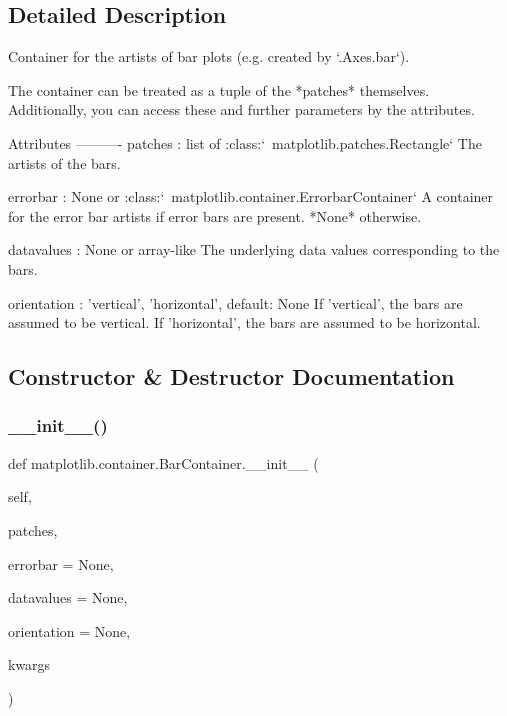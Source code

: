 \subsection{Detailed Description}
\begin{DoxyVerb}Container for the artists of bar plots (e.g. created by `.Axes.bar`).

The container can be treated as a tuple of the *patches* themselves.
Additionally, you can access these and further parameters by the
attributes.

Attributes
----------
patches : list of :class:`~matplotlib.patches.Rectangle`
    The artists of the bars.

errorbar : None or :class:`~matplotlib.container.ErrorbarContainer`
    A container for the error bar artists if error bars are present.
    *None* otherwise.

datavalues : None or array-like
    The underlying data values corresponding to the bars.

orientation : {'vertical', 'horizontal'}, default: None
    If 'vertical', the bars are assumed to be vertical.
    If 'horizontal', the bars are assumed to be horizontal.\end{DoxyVerb}
 

\subsection{Constructor \& Destructor Documentation}
\mbox{\label{classmatplotlib_1_1container_1_1BarContainer_a9604d76d1dfcdc6f38fad980ab65397a}} 
\subsubsection{\texorpdfstring{\+\_\+\+\_\+init\+\_\+\+\_\+()}{\_\_init\_\_()}}
{\footnotesize\ttfamily def matplotlib.\+container.\+Bar\+Container.\+\_\+\+\_\+init\+\_\+\+\_\+ (\begin{DoxyParamCaption}\item[{}]{self,  }\item[{}]{patches,  }\item[{}]{errorbar = {\ttfamily None},  }\item[{}]{datavalues = {\ttfamily None},  }\item[{}]{orientation = {\ttfamily None},  }\item[{}]{kwargs }\end{DoxyParamCaption})}



